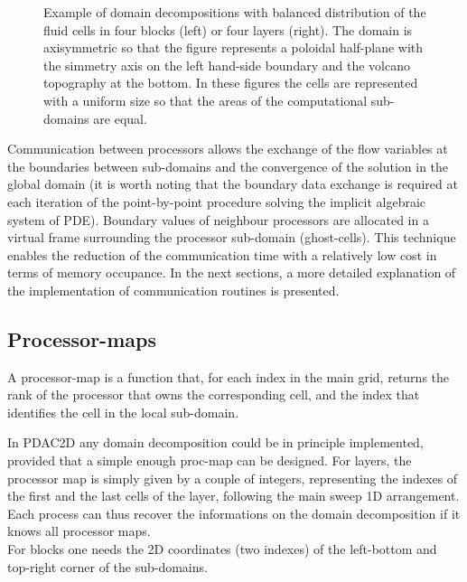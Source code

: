 %
\begin{figure}[htb]
\setlength{\unitlength}{1mm}
\begin{center}
\begin{minipage}{6cm}
\centerline{}
\end{minipage}
\begin{minipage}{6cm}
\centerline{}
\end{minipage}
\end{center}
\caption{Example of domain decompositions with balanced distribution of
the fluid cells in four blocks (left) or four layers (right).
The domain is axisymmetric so that the figure represents a poloidal
half-plane with the simmetry axis on the left hand-side boundary and
the volcano topography at the bottom. In these figures the cells are represented
with a uniform size so that the areas of the computational sub-domains
are equal.\label{fig:Ves_part}}
\end{figure}
%

Communication between processors allows the exchange of the flow variables
at the boundaries between sub-domains and the convergence of the solution
in the global domain (it is worth noting that the
boundary data exchange is required at each iteration of the point-by-point
procedure solving the implicit algebraic system of PDE).
Boundary values of neighbour processors are allocated in a virtual
frame surrounding the processor sub-domain (ghost-cells). This technique
enables the reduction of the communication time with a relatively low cost
in terms of memory occupance.
In the next sections, a more detailed explanation of the implementation of communication
routines is presented.
%
\subsection{Processor-maps}
A processor-map is a function that, for each index in the main grid, returns the rank
of the processor that owns the corresponding cell, and the index that identifies the
cell in the local sub-domain.

In PDAC2D any domain decomposition could be in principle implemented, provided that a 
simple enough proc-map can be designed.
For layers, the processor map is simply given by a couple of integers,
representing the indexes of the first and the last cells of the layer, following
the main sweep 1D arrangement.  Each process can thus recover
the informations on the domain decomposition if it knows all processor maps.\\
For blocks one needs the 2D coordinates (two indexes) of the left-bottom and
top-right corner of the sub-domains.

